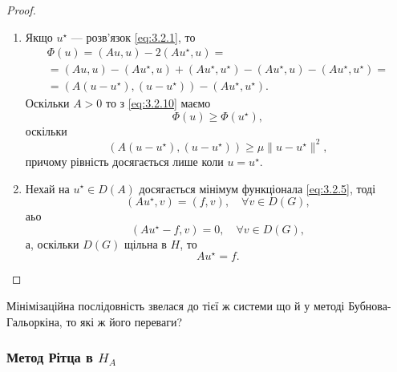 \begin{proof}
    $\left.\right.$
    \begin{enumerate}
        \item Якщо $u^\star$ --- розв'язок \eqref{eq:3.2.1}, то
        \begin{multline}
            \label{eq:3.2.10}
            \Phi(u) = (Au, u) - 2 (Au^\star, u) = \\
            = (Au, u) - (Au^\star, u) + (Au^\star, u^\star) - (Au^\star, u) - (A u^\star, u^\star) = \\
            = (A (u - u^\star), (u - u^\star)) - (A u^\star, u^\star).
        \end{multline}
        Оскільки $A > 0$ то з \eqref{eq:3.2.10} маємо
        \begin{equation}
            \label{eq:3.2.11}
            \Phi(u) \ge \Phi(u^\star),
        \end{equation}
        оскільки 
        \begin{equation*}
            (A (u - u^\star), (u - u^\star)) \ge \mu \|u - u^\star\|^2,
        \end{equation*}
        причому рівність досягається лише коли $u = u^\star$.

        \item Нехай на $u^\star \in D(A)$ досягається мінімум функціонала \eqref{eq:3.2.5}, тоді
        \begin{equation}
            \label{eq:3.2.12}
            (A u^\star, v) = (f, v), \quad \forall v \in D(G),
        \end{equation}
        аьо
        \begin{equation*}
            (A u^\star - f, v) = 0, \quad \forall v \in D(G),
        \end{equation*}
        а, оскільки $D(G)$ щільна в $H$, то
        \begin{equation}
            \label{eq:3.2.14}
            A u^\star = f.
        \end{equation}
    \end{enumerate}
\end{proof}

\begin{remark}
    Мінімізаційна послідовність звелася до тієї ж системи що й у методі Бубнова-Гальоркіна, то які ж його переваги?
\end{remark}

\subsubsection{Метод Рітца в \texorpdfstring{$H_A$}{HA}}

